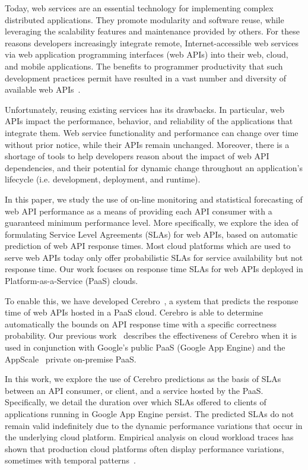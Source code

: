 Today, web services are an essential technology for implementing
complex distributed applications. They promote modularity and software reuse,
while leveraging the scalability features and maintenance 
provided by others. For these reasons developers increasingly integrate remote, 
Internet-accessible web services via web application programming interfaces (web APIs)
into their web, cloud, and mobile applications.  
The benefits to programmer productivity that such development practices
permit have resulted in a vast number and diversity of available web APIs~\cite{pweb}.

Unfortunately, reusing existing services has its drawbacks. In particular, 
web APIs impact the performance, behavior, and reliability of the applications
that integrate them.  Web service functionality and performance can change over time 
without prior notice, while their APIs remain unchanged.
Moreover, there is a shortage of tools to help developers 
reason about the impact of web API dependencies, and their potential for
dynamic change throughout an application's 
lifecycle (i.e. development, deployment, and runtime).  

In this paper, we study the use of on-line monitoring and statistical
forecasting of web API performance as a means of providing each API
consumer with a guaranteed minimum performance level.
More specifically, we explore the idea of formulating Service Level Agreements (SLAs)
for web APIs, based on automatic prediction of web API response times.
Most cloud platforms which are used to serve web APIs today only offer probabilistic
SLAs for service availability but not response time. 
Our work focuses on response time SLAs for web APIs deployed
in Platform-as-a-Service (PaaS) clouds.


To enable this, we have developed Cerebro~\cite{cerebro-soccsub15},
a system that
predicts the response time of web APIs hosted in a PaaS cloud. Cerebro is able to
determine automatically the bounds on API response time with a specific
correctness probability.
Our previous work~\cite{cerebro-soccsub15} describes the effectiveness of
Cerebro when it is used in conjunction with Google's public PaaS (Google
App Engine) and the AppScale~\cite{6488671} private on-premise PaaS.  

In this work, we
explore the use of Cerebro predictions as the basis of SLAs between an API
consumer, or client,
and a service hosted by the PaaS.  Specifically, we detail the duration
over which SLAs offered to clients of applications running in Google App
Engine persist. The predicted SLAs do not remain valid indefinitely due to the
dynamic performance variations that occur in the underlying cloud platform.
Empirical analysis on cloud workload traces has shown that production cloud
platforms often display performance variations, sometimes with temporal
patterns~\cite{5948601}.

